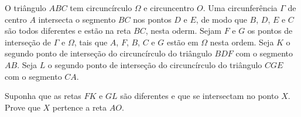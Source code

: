 O triângulo $ABC$ tem circuncírculo $\Omega$ e circuncentro $O$. Uma circunferência $\Gamma$ de centro $A$ intersecta o segmento $BC$ nos pontos $D$ e $E$, de modo que $B$, $D$, $E$ e $C$ são todos diferentes e estão na reta $BC$, nesta oderm. Sejam $F$ e $G$ os pontos de interseção de $\Gamma$ e $\Omega$, tais que $A$, $F$, $B$, $C$ e $G$ estão em $\Omega$ nesta ordem. Seja $K$ o segundo ponto de interseção do circuncírculo do triângulo $BDF$ com o segmento $AB$. Seja $L$ o segundo ponto de interseção do circuncírculo do triângulo $CGE$ com o segmento $CA$.

Suponha que as retas $FK$ e $GL$ são diferentes e que se intersectam no ponto $X$. Prove que $X$ pertence a reta $AO$.
